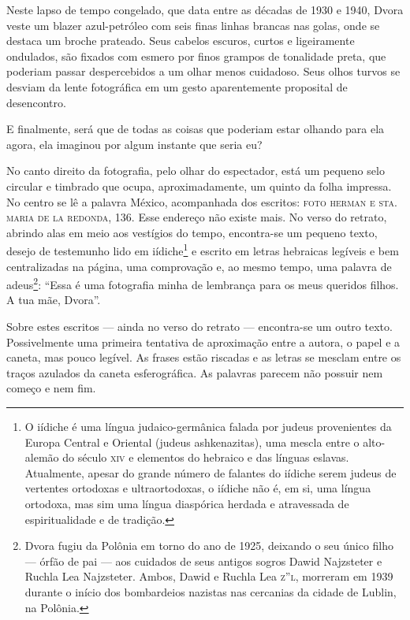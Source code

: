 Neste lapso de tempo congelado, que data entre as décadas de 1930 e
1940, Dvora veste um blazer azul-petróleo com seis finas linhas brancas
nas golas, onde se destaca um broche prateado. Seus cabelos escuros,
curtos e ligeiramente ondulados, são fixados com esmero por finos
grampos de tonalidade preta, que poderiam passar despercebidos a um
olhar menos cuidadoso. Seus olhos turvos se desviam da lente fotográfica
em um gesto aparentemente proposital de desencontro. 

E finalmente, será que de todas as coisas que poderiam estar olhando para ela agora,
ela imaginou por algum instante que seria eu?

No canto direito da fotografia, pelo olhar do espectador, está um
pequeno selo circular e timbrado que ocupa, aproximadamente, um quinto da
folha impressa. No centro se lê a palavra México, acompanhada dos
escritos: \textsc{foto herman e sta. maria de la redonda}, 136. Esse endereço não
existe mais. No verso do retrato, abrindo alas em meio aos vestígios do
tempo, encontra-se um pequeno texto, desejo de testemunho lido em
iídiche\footnote{O iídiche é uma língua judaico-germânica
  falada por judeus provenientes da Europa Central e Oriental (judeus
  ashkenazitas), uma mescla entre o alto-alemão do século \textsc{xiv} e
  elementos do hebraico e das línguas eslavas. Atualmente, apesar do
  grande número de falantes do iídiche serem judeus de vertentes
  ortodoxas e ultraortodoxas, o iídiche não é, em si, uma língua
  ortodoxa, mas sim uma língua diaspórica herdada e atravessada de
  espiritualidade e de tradição.} e escrito em letras hebraicas legíveis
e bem centralizadas na página, uma comprovação e, ao mesmo tempo, uma
palavra de adeus\footnote{Dvora fugiu da Polônia em torno do ano de
  1925, deixando o seu único filho --- órfão de pai --- aos cuidados de
  seus antigos sogros Dawid Najzsteter e Ruchla Lea Najzsteter. Ambos,
  Dawid e Ruchla Lea \textsc{z''l}, morreram em 1939 durante o início dos
  bombardeios nazistas nas cercanias da cidade de Lublin, na Polônia.}:
``Essa é uma fotografia minha de lembrança para os meus queridos
filhos. A tua mãe, Dvora''.

Sobre estes escritos --- ainda no verso do retrato --- encontra-se um
outro texto. Possivelmente uma primeira tentativa de aproximação entre a
autora, o papel e a caneta, mas pouco legível. As frases estão riscadas
e as letras se mesclam entre os traços azulados da caneta esferográfica.
As palavras parecem não possuir nem começo e nem fim.


